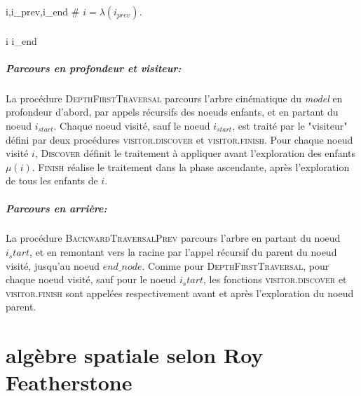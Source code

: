 \documentclass{report}
\begin{document}
\begin{flushleft}
\begin{minipage}[t]{\textwidth}
\begin{multicols}{2}
\begin{spacing}{1.5}
\begin{pseudocode}[display]{}{}
{		                                     i,i_{prev},i_{end}}
		    \textnormal{\# $i=\lambda(i_{prev})$.} \\
         \\
        \IF i \neq i_{end}
        \THEN {} \\
		\ENDPROCEDURE
	  \end{pseudocode}
	  \end{spacing}
\end{multicols}
\end{minipage}
\end{flushleft}

\paragraph{Parcours en profondeur et visiteur:}
La procédure \textsc{DepthFirstTraversal} parcours l'arbre cinématique du \emph{model} en profondeur d'abord, par appels récursifs des noeuds enfants, et en partant du noeud $i_{start}$. Chaque noeud visité, sauf le noeud $i_{start}$, est traité par le "visiteur" défini par deux procédures \textsc{visitor.discover} et \textsc{visitor.finish}. Pour chaque noeud visité $i$, \textsc{Discover} définit le traitement à appliquer avant l'exploration des enfants $\mu(i)$. \textsc{Finish} réalise le traitement dans la phase ascendante, \cad après l'exploration de tous les enfants de $i$.

\paragraph{Parcours en arrière:}
La procédure \textsc{BackwardTraversalPrev} parcours l'arbre en partant du noeud $i_start$, et en remontant vers la racine par l'appel récursif du parent du noeud visité, jusqu'au noeud $end\_node$. Comme pour \textsc{DepthFirstTraversal}, pour chaque noeud visité, sauf pour le noeud $i_start$, les fonctions \textsc{visitor.discover} et \textsc{visitor.finish} sont appelées respectivement avant et après l'exploration du noeud parent.



\chapter{algèbre spatiale selon Roy Featherstone}
\end{document}
